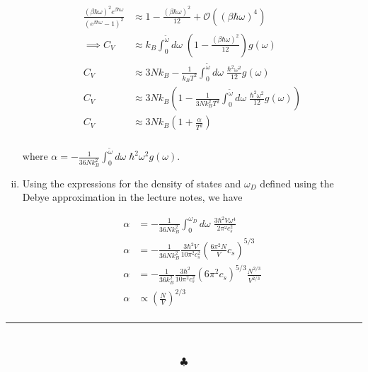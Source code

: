 \documentclass[]{article}
\begin{document}
\begin{enumerate}[(i)]
\begin{equation}
\begin{split}
\frac{ ( \beta \hbar \omega )^2   e^{\beta\hbar\omega} }{ \left( e^{\beta\hbar\omega} - 1 \right)^2 } & \approx  1 -  \frac{ ( \beta \hbar \omega )^2 }{ 12 } + \mathcal{O}\left(  \left( \beta \hbar \omega \right)^4 \right) \\ 
\implies C_V & \approx    k_B \int_{0}^{\tilde{\omega}} d\omega \;  \left( 1 -  \frac{ ( \beta \hbar \omega )^2 }{ 12 } \right) g(\omega )  \\
C_V & \approx    3N k_B  -  \frac{ 1 }{ k_B T^2 } \int_{0}^{\tilde{\omega}} d\omega \;  \frac{ \hbar^2 \omega^2  }{ 12 }g(\omega )  \\
C_V & \approx    3N k_B \left( 1  -  \frac{1}{3Nk_B^2 T^2} \int_{0}^{\tilde{\omega}} d\omega \;  \frac{  \hbar^2 \omega^2  }{ 12 }g(\omega )  \right)  \\
C_V & \approx    3N k_B \left( 1  +  \frac{\alpha }{T^2}  \right)  \\
\end{split}
\end{equation}

where $\alpha = -  \frac{1}{36 Nk_B^2 } \int_{0}^{\tilde{\omega}} d\omega \;  \hbar^2 \omega^2  g(\omega ) $. \\

\item Using the expressions for the density of states and $\omega_D$ defined using the Debye approximation in the lecture notes, we have

\begin{equation}
\begin{split}
\alpha & =  -  \frac{1}{36 Nk_B^2 } \int_{0}^{\omega_D} d\omega \;   \frac{ 3 \hbar^2 V \omega^4}{ 2 \pi^2 c_s^2}  \\
\alpha & =  -  \frac{1}{36 Nk_B^2 } \frac{ 3 \hbar^2 V }{ 10 \pi^2 c_s^2} \left(  \frac{6 \pi^2 N}{ V } c_s\right)^{5/3} \\
\alpha & =  -  \frac{1}{36 k_B^2 } \frac{ 3 \hbar^2  }{ 10 \pi^2 c_s^2} \left(  6 \pi^2c_s\right)^{5/3} \frac{N^{2/3}}{V^{2/3}} \\
\alpha & \propto \left( \frac{N}{V}  \right)^{2/3} \\
\end{split}
\end{equation}




\end{enumerate}




\begin{center}
\noindent\rule{15cm}{0.4pt} \\
\end{center}
$$\clubsuit$$
\end{document}
